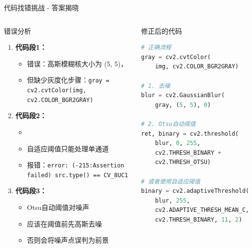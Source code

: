 
\begin{frame}[fragile]{代码找错挑战 - 答案揭晓}
    \begin{columns}
        \begin{block}{错误分析}
            \begin{enumerate}
                \item \textbf{代码段1：}
                \begin{itemize}
                    \item 错误：高斯模糊核大小为 (5, 5)，
                    \item 但缺少灰度化步骤：\texttt{gray = cv2.cvtColor(img, cv2.COLOR\_BGR2GRAY)}
                \end{itemize}

                \item \textbf{代码段2：}
                \begin{itemize}
                    \item {}
                    \item 自适应阈值只能处理单通道
                    \item 报错：\texttt{error: (-215:Assertion failed) src.type() == CV\_8UC1}
                \end{itemize}

                \item \textbf{代码段3：}
                \begin{itemize}
                    \item Otsu自动阈值对噪声
                    \item 应该在阈值前先高斯去噪
                    \item 否则会将噪声点误判为前景
                \end{itemize}
            \end{enumerate}
        \end{block}

        \begin{block}{修正后的代码}
            \begin{lstlisting}[language=Python, basicstyle=\ttfamily\tiny]
# 正确流程
gray = cv2.cvtColor(
    img, cv2.COLOR_BGR2GRAY)

# 1. 去噪
blur = cv2.GaussianBlur(
    gray, (5, 5), 0)

# 2. Otsu自动阈值
ret, binary = cv2.threshold(
    blur, 0, 255,
    cv2.THRESH_BINARY +
    cv2.THRESH_OTSU)

# 或者使用自适应阈值
binary = cv2.adaptiveThreshold(
    blur, 255,
    cv2.ADAPTIVE_THRESH_MEAN_C,
    cv2.THRESH_BINARY, 11, 2)
            \end{lstlisting}
        \end{block}
    \end{columns}
\end{frame}
